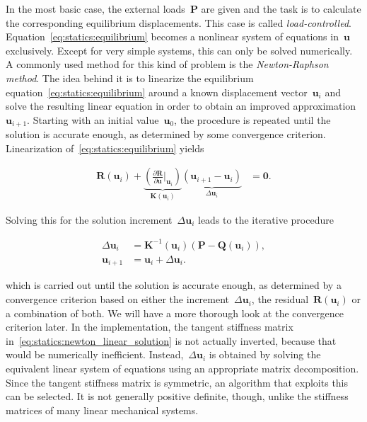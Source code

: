 In the most basic case, the external loads~$\boldsymbol{P}$ are given and the task is to calculate the corresponding equilibrium displacements.
This case is called \textit{load-controlled}.
Equation~\eqref{eq:statics:equilibrium} becomes a nonlinear system of equations in~$\boldsymbol{u}$ exclusively.
Except for very simple systems, this can only be solved numerically.
A commonly used method for this kind of problem is the \textit{Newton-Raphson method}. The idea behind it is to linearize the equilibrium equation~\eqref{eq:statics:equilibrium} around a known displacement vector~$\boldsymbol{u}_i$ and solve the resulting linear equation in order to obtain an improved approximation~$\boldsymbol{u}_{i+1}$.
Starting with an initial value~$\boldsymbol{u}_0$, the procedure is repeated until the solution is accurate enough, as determined by some convergence criterion.
Linearization of~\eqref{eq:statics:equilibrium} yields

\begin{align}
\boldsymbol{R}(\boldsymbol{u}_i) +
\underbrace{
\left(\frac{\partial \boldsymbol{R}}{\partial \boldsymbol{u}}\bigg \vert_{\boldsymbol{u}_i}\right)
}_{\boldsymbol{K}(\boldsymbol{u}_i)}
\underbrace{
(\boldsymbol{u}_{i+1} - \boldsymbol{u}_i)
}_{\Delta\boldsymbol{u}_i} &= \boldsymbol{0}.
\end{align}


Solving this for the solution increment~$\Delta\boldsymbol{u}_i$ leads to the iterative procedure

\begin{align}
\Delta\boldsymbol{u}_i &= \boldsymbol{K}^{-1}(\boldsymbol{u}_i)\left(\boldsymbol{P} - \boldsymbol{Q}(\boldsymbol{u}_i)\right),\label{eq:statics:newton_linear_solution}\\
\boldsymbol{u}_{i+1} &= \boldsymbol{u}_i + \Delta\boldsymbol{u}_i.\label{eq:statics:newton_iteration}
\end{align}

which is carried out until the solution is accurate enough, as determined by a convergence criterion based on either the increment~$\Delta\boldsymbol{u}_i$, the residual~$\boldsymbol{R}(\boldsymbol{u}_i)$ or a combination of both.
We will have a more thorough look at the convergence criterion later.
In the implementation, the tangent stiffness matrix in~\eqref{eq:statics:newton_linear_solution} is not actually inverted, because that would be numerically inefficient.
Instead,~$\Delta\boldsymbol{u}_i$ is obtained by solving the equivalent linear system of equations using an appropriate matrix decomposition.
Since the tangent stiffness matrix is symmetric, an algorithm that exploits this can be selected.
It is not generally positive definite, though, unlike the stiffness matrices of many linear mechanical systems.

